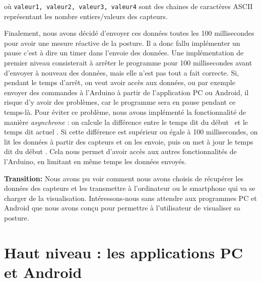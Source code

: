 \documentclass{polytech/polytech}
\begin{document}
où \texttt{valeur1, valeur2, valeur3, valeur4} sont des chaines de caractères ASCII représentant les nombre entiers/valeurs des capteurs. 

Finalement, nous avons décidé d'envoyer ces données toutes les 100 millisecondes pour avoir une mesure réactive de la posture. Il a donc fallu implémenter un pause c'est à dire un \guillemotleft timer \guillemotright  dans l'envoie des données.
 Une implémentation de premier niveau consisterait à arrêter le programme pour 100 millisecondes avant d'envoyer à nouveau des données, mais elle n'est pas tout a fait correcte.
  Si, pendant le temps d'arrêt, on veut avoir accès aux données, ou par exemple envoyer des commandes à l'Arduino à partir de l'application PC ou Android, il risque d'y avoir des problèmes, car le programme sera en pause pendant ce temps-là.
   Pour éviter ce problème, nous avons implémenté la fonctionnalité de manière \textit{asynchrone} : on calcule la différence entre le temps dit \guillemotleft du début \guillemotright\ et le temps dit \guillemotleft actuel \guillemotright . 
   Si cette différence est supérieur ou égale à 100 millisecondes, on lit les données à partir des capteurs et on les envoie, puis on met à jour le temps dit \guillemotleft du début \guillemotright . 
   Cela nous permet d'avoir accès aux autres fonctionnalités de l'Arduino, en limitant en même temps les données envoyés.


\textbf{Transition:} Nous avons pu voir comment nous avons choisis de récupérer les données des capteurs et les transmettre à l'ordinateur ou le smartphone qui va se charger de la visualisation. Intéressons-nous sans attendre aux programmes PC et Android que nous avons conçu pour permettre à l'utilisateur de visualiser sa posture.

\section{Haut niveau : les applications PC et Android}
\label{sec:logiciel_haut}
\end{document}
